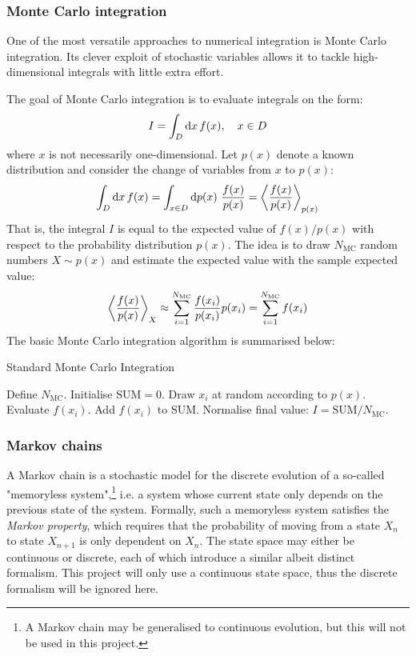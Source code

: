 \documentclass[nofootinbib,reprint,english]{revtex4-1}
\begin{document}
\subsubsection{Monte Carlo integration}
One of the most versatile approaches to numerical integration is Monte Carlo integration. Its clever exploit of stochastic variables allows it to tackle high-dimensional integrals with little extra effort.

The goal of Monte Carlo integration is to evaluate integrals on the form:
\begin{equation}\label{eq:general_integral}
I=\int_D\dd{x}f(x)\qc x\in D
\end{equation}
where \(x\) is not necessarily one-dimensional. Let \(p(x)\) denote a known distribution and consider the change of variables from \(x\) to \(p(x)\):
\begin{equation}\label{eq:integral_to_expected_value}
\int_D\dd{x}f(x)=\int_{x\in D}\dd{p(x)}\,\frac{f(x)}{p(x)}=\expval{\frac{f(x)}{p(x)}}_{p(x)}
\end{equation}
That is, the integral \(I\) is equal to the expected value of \(f(x)/p(x)\) with respect to the probability distribution \(p(x)\). The idea is to draw \(N_\text{MC}\) random numbers \(X\sim p(x)\) and estimate the expected value with the sample expected value:
\begin{equation}\label{eq:approximated_expected_value}
\expval{\frac{f(x)}{p(x)}}_X\approx\sum_{i=1}^{N_\text{MC}}\frac{f(x_i)}{p(x_i)}p(x_i)=\sum_{i=1}^{N_\text{MC}}f(x_i)
\end{equation}
The basic Monte Carlo integration algorithm is summarised below:
\begin{algorithm}[H]
\caption{Standard Monte Carlo Integration}\label{algo:standard_Monte_Carlo}
\begin{algorithmic}[1]
\State Define \(N_\text{MC}\).
\State Initialise \(\text{SUM}=0\).
	\State Draw \(x_i\) at random according to \(p(x)\).
	\State Evaluate \(f(x_i)\).
	\State Add \(f(x_i)\) to SUM.
\EndFor
\State Normalise final value: \(I=\text{SUM}/N_\text{MC}\).
\end{algorithmic}
\end{algorithm}

\subsubsection{Markov chains}
A Markov chain is a stochastic model for the discrete evolution of a so-called "memoryless system",\footnote{A Markov chain may be generalised to continuous evolution, but this will not be used in this project.} i.e. a system whose current state only depends on the previous state of the system. Formally, such a memoryless system satisfies the \emph{Markov property}, which requires that the probability of moving from a state \(X_n\) to state \(X_{n+1}\) is only dependent on \(X_n\). The state space may either be continuous or discrete, each of which introduce a similar albeit distinct formalism. This project will only use a continuous state space, thus the discrete formalism will be ignored here.
\end{document}

